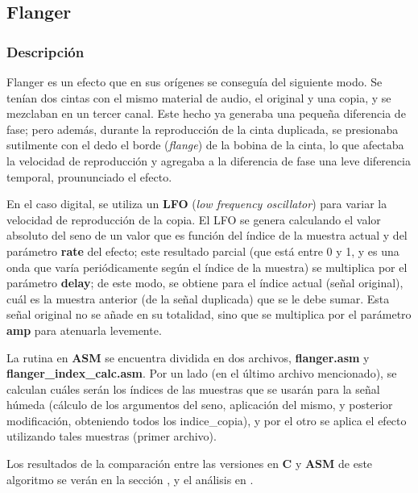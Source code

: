 \subsection{Flanger}
\label{subsec:desarrollo-flanger}

\subsubsection{Descripción}
\label{subsec:desarrollo-flanger-desc}

Flanger es un efecto que en sus orígenes se conseguía del siguiente modo. Se tenían dos cintas con el mismo material de audio, el original y una copia, y se mezclaban en un tercer canal. Este hecho ya generaba una pequeña diferencia de fase; pero además, durante la reproducción de la cinta duplicada, se presionaba sutilmente con el dedo el borde (\textit{flange}) de la bobina de la cinta, lo que afectaba la velocidad de reproducción y agregaba a la diferencia de fase una leve diferencia temporal, proununciado el efecto.

En el caso digital, se utiliza un \textbf{LFO} (\textit{low frequency oscillator}) para variar la velocidad de reproducción de la copia. El LFO se genera calculando el valor absoluto del seno de un valor que es función del índice de la muestra actual y del parámetro \textbf{rate} del efecto; este resultado parcial (que está entre 0 y 1, y es una onda que varía periódicamente según el índice de la muestra) se multiplica por el parámetro  \textbf{delay}; de este modo, se obtiene para el índice actual (señal original), cuál es la muestra anterior (de la señal duplicada) que se le debe sumar. Esta señal original no se añade en su totalidad, sino que se multiplica por el parámetro \textbf{amp} para atenuarla levemente.

La rutina en \textbf{ASM} se encuentra dividida en dos archivos, \textbf{flanger.asm} y \textbf{flanger\_index\_calc.asm}. Por un lado (en el último archivo mencionado), se calculan cuáles serán los índices de las muestras que se usarán para la señal húmeda (cálculo de los argumentos del seno, aplicación del mismo, y posterior modificación, obteniendo todos los indice\_copia), y por el otro se aplica el efecto utilizando tales muestras (primer archivo).

\vspace{\baselineskip}

Los resultados de la comparación entre las versiones en \textbf{C} y \textbf{ASM} de este algoritmo se verán en la sección , y el análisis en .

